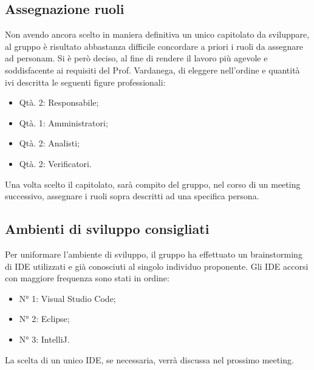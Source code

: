 \subsection{Assegnazione ruoli}
Non avendo ancora scelto in maniera definitiva un unico capitolato da sviluppare, al gruppo è risultato abbastanza difficile concordare a priori i ruoli da
assegnare ad personam. Si è però deciso, al fine di rendere il lavoro più agevole e soddisfacente ai requisiti del Prof. Vardanega, di eleggere nell’ordine e
quantità ivi descritta le seguenti figure professionali:
\begin{itemize}
	\item Qtà. 2: Responsabile;
	\item Qtà. 1: Amministratori;
	\item Qtà. 2: Analisti;
	\item Qtà. 2: Verificatori.
\end{itemize}

Una volta scelto il capitolato, sarà compito del gruppo, nel corso di un meeting
successivo, assegnare i ruoli sopra descritti ad una specifica persona.
\subsection{Ambienti di sviluppo consigliati}
Per uniformare l’ambiente di sviluppo, il gruppo ha effettuato un brainstorming
di IDE utilizzati e già conosciuti al singolo individuo proponente. Gli IDE
accorsi con maggiore frequenza sono stati in ordine:
\begin{itemize}
	\item N° 1: Visual Studio Code;
	\item N° 2: Eclipse;
	\item N° 3: IntelliJ.
\end{itemize}

La scelta di un unico IDE, se necessaria, verrà discussa nel prossimo meeting.